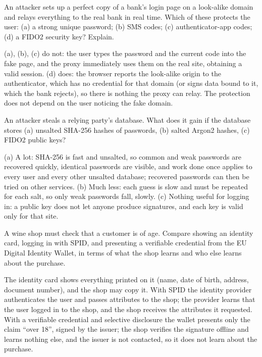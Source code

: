\begin{exercise}
An attacker sets up a perfect copy of a bank's login page on a look-alike domain and relays everything to the real bank in real time. Which of these protects the user: (a) a strong unique password; (b) SMS codes; (c) authenticator-app codes; (d) a FIDO2 security key? Explain.
\end{exercise}
\begin{solution}
(a), (b), (c) do not: the user types the password and the current code into the fake page, and the proxy immediately uses them on the real site, obtaining a valid session. (d) does: the browser reports the look-alike origin to the authenticator, which has no credential for that domain (or signs data bound to it, which the bank rejects), so there is nothing the proxy can relay. The protection does not depend on the user noticing the fake domain.
\end{solution}

\begin{exercise}
An attacker steals a relying party's database. What does it gain if the database stores (a) unsalted SHA-256 hashes of passwords, (b) salted Argon2 hashes, (c) FIDO2 public keys?
\end{exercise}
\begin{solution}
(a) A lot: SHA-256 is fast and unsalted, so common and weak passwords are recovered quickly, identical passwords are visible, and work done once applies to every user and every other unsalted database; recovered passwords can then be tried on other services. (b) Much less: each guess is slow and must be repeated for each salt, so only weak passwords fall, slowly. (c) Nothing useful for logging in: a public key does not let anyone produce signatures, and each key is valid only for that site.
\end{solution}

\begin{exercise}
A wine shop must check that a customer is of age. Compare showing an identity card, logging in with SPID, and presenting a verifiable credential from the EU Digital Identity Wallet, in terms of what the shop learns and who else learns about the purchase.
\end{exercise}
\begin{solution}
The identity card shows everything printed on it (name, date of birth, address, document number), and the shop may copy it. With SPID the identity provider authenticates the user and passes attributes to the shop; the provider learns that the user logged in to the shop, and the shop receives the attributes it requested. With a verifiable credential and selective disclosure the wallet presents only the claim \enquote{over 18}, signed by the issuer; the shop verifies the signature offline and learns nothing else, and the issuer is not contacted, so it does not learn about the purchase.
\end{solution}
